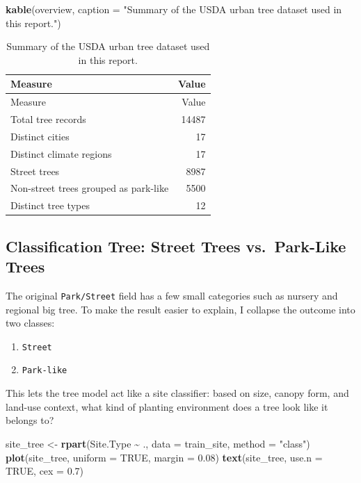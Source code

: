 \documentclass[
  11pt,
]{article}
\newenvironment{Shaded}{\begin{snugshade}}{\end{snugshade}}
\newcommand{\AttributeTok}[1]{\textcolor[rgb]{0.13,0.29,0.53}{#1}}
\newcommand{\ConstantTok}[1]{\textcolor[rgb]{0.56,0.35,0.01}{#1}}
\newcommand{\FloatTok}[1]{\textcolor[rgb]{0.00,0.00,0.81}{#1}}
\newcommand{\FunctionTok}[1]{\textcolor[rgb]{0.13,0.29,0.53}{\textbf{#1}}}
\newcommand{\NormalTok}[1]{#1}
\newcommand{\OtherTok}[1]{\textcolor[rgb]{0.56,0.35,0.01}{#1}}
\newcommand{\SpecialCharTok}[1]{\textcolor[rgb]{0.81,0.36,0.00}{\textbf{#1}}}
\newcommand{\StringTok}[1]{\textcolor[rgb]{0.31,0.60,0.02}{#1}}
\providecommand{\tightlist}{%
  \setlength{\itemsep}{0pt}\setlength{\parskip}{0pt}}
\begin{document}
\begin{Shaded}
\begin{Highlighting}[]
\FunctionTok{kable}\NormalTok{(overview, }\AttributeTok{caption =} \StringTok{"Summary of the USDA urban tree dataset used in this report."}\NormalTok{)}
\end{Highlighting}
\end{Shaded}

\begin{longtable}[]{@{}lr@{}}
\caption{Summary of the USDA urban tree dataset used in this
report.}\tabularnewline
\toprule\noalign{}
Measure & Value \\
\midrule\noalign{}
\endfirsthead
\toprule\noalign{}
Measure & Value \\
\midrule\noalign{}
\endhead
\bottomrule\noalign{}
\endlastfoot
Total tree records & 14487 \\
Distinct cities & 17 \\
Distinct climate regions & 17 \\
Street trees & 8987 \\
Non-street trees grouped as park-like & 5500 \\
Distinct tree types & 12 \\
\end{longtable}

\subsection{Classification Tree: Street Trees vs.~Park-Like
Trees}\label{classification-tree-street-trees-vs.-park-like-trees}

The original \texttt{Park/Street} field has a few small categories such
as nursery and regional big tree. To make the result easier to explain,
I collapse the outcome into two classes:

\begin{enumerate}
\def\labelenumi{\arabic{enumi}.}
\tightlist
\item
  \texttt{Street}
\item
  \texttt{Park-like}
\end{enumerate}

This lets the tree model act like a site classifier: based on size,
canopy form, and land-use context, what kind of planting environment
does a tree look like it belongs to?

\begin{Shaded}
\begin{Highlighting}[]
\NormalTok{site\_tree }\OtherTok{\textless{}{-}} \FunctionTok{rpart}\NormalTok{(Site.Type }\SpecialCharTok{\textasciitilde{}}\NormalTok{ ., }\AttributeTok{data =}\NormalTok{ train\_site, }\AttributeTok{method =} \StringTok{"class"}\NormalTok{)}
\FunctionTok{plot}\NormalTok{(site\_tree, }\AttributeTok{uniform =} \ConstantTok{TRUE}\NormalTok{, }\AttributeTok{margin =} \FloatTok{0.08}\NormalTok{)}
\FunctionTok{text}\NormalTok{(site\_tree, }\AttributeTok{use.n =} \ConstantTok{TRUE}\NormalTok{, }\AttributeTok{cex =} \FloatTok{0.7}\NormalTok{)}
\end{Highlighting}
\end{Shaded}
\end{document}
